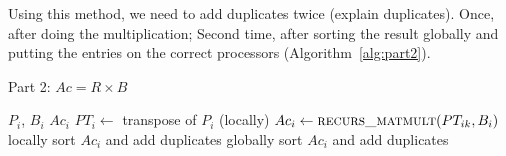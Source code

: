 Using this method, we need to add duplicates twice (explain duplicates). Once, after doing the multiplication; Second time, after sorting the result globally and putting the entries on the correct processors (Algorithm~\ref{alg:part2}).

\begin{algorithm}[H] 
  \caption{Part 2: $Ac = R \times B$} \label{alg:part2} 
  \begin{algorithmic}[1]
    \Require $P_i$, $B_i$
    \Ensure  $Ac_i$
    \State $PT_i \leftarrow$ transpose of $P_i$ (locally)
      \State $Ac_i \leftarrow \textsc{recurs\_matmult}(PT_{ik}, B_i)$
    \EndFor
    \State locally sort $Ac_i$ and add duplicates
    \State globally sort $Ac_i$ and add duplicates
  \end{algorithmic}
\end{algorithm}
